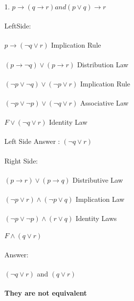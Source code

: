 \documentclass[11pt]{article}
\begin{document}
1. $p \rightarrow ( q \rightarrow r) and (p \lor q) \rightarrow r $\\\\

LeftSide: \\\\
$ p \rightarrow ( \neg q \lor r ) $ 
Implication Rule \\\\
$ (p \rightarrow \neg q) \lor ( p \rightarrow r ) $ 
Distribution Law \\\\
$ (\neg p \lor \neg q) \lor ( \neg p \lor r ) $ 
Implication Rule \\\\
$ (\neg p \lor \neg p ) \lor ( \neg q \lor r ) $ 
Associative Law \\\\ 
$ F \lor ( \neg q \lor r ) $ 
Identity Law \\\\ 
Left Side Answer :
$(\neg q \lor r ) $ \\\\

Right Side: \\\\
$(p \rightarrow r) \lor (p \rightarrow q)$
Distributive Law \\\\ 
$ (\neg p \lor r ) \land ( \neg p \lor q ) $
Implication Law \\\\ 
$ ( \neg p \lor \neg p ) \land ( r \lor q) $ 
Identity Laws \\\\ 
$ F \land (q \lor r )$ \\\\
Answer: \\\\
$ ( \neg q \lor r)$ and $(q \lor r) $ \\\\
\textbf {They are not equivalent} \\\\
\end{document}

